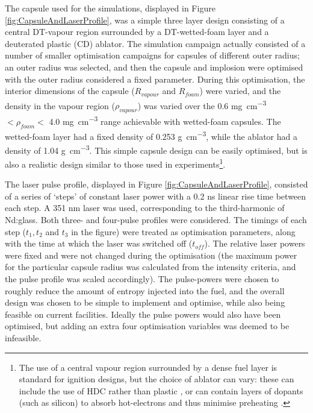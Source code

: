 The capsule used for the simulations, displayed in Figure \ref{fig:CapsuleAndLaserProfile}, was a simple three layer design consisting of a central DT-vapour region surrounded by a DT-wetted-foam layer and a deuterated plastic (CD) ablator. The simulation campaign actually consisted of a number of smaller optimisation campaigns for capsules of different outer radius; an outer radius was selected, and then the capsule and implosion were optimised with the outer radius considered a fixed parameter. During this optimisation, the interior dimensions of the capsule ($R_{vapour}$ and $R_{foam}$) were varied, and the density in the vapour region ($\rho_{vapour}$) was varied over the 0.6 \unit{\milli\gram\per\centi\meter\cubed} $< \rho_{foam} <$ 4.0 \unit{\milli\gram\per\centi\meter\cubed} range achievable with wetted-foam capsules. The wetted-foam layer had a fixed density of 0.253 \unit{\gram\per\centi\meter\cubed}, while the ablator had a density of 1.04 \unit{\gram\per\centi\meter\cubed}. This simple capsule design can be easily optimised, but is also a realistic design similar to those used in experiments\footnote{ The use of a central vapour region surrounded by a dense fuel layer is standard for ignition designs, but the choice of ablator can vary: these can include the use of HDC rather than plastic \cite{Mackinnon2014}, or can contain layers of dopants (such as silicon) to absorb hot-electrons and thus minimise preheating \cite{Solodov2022}.}. 

The laser pulse profile, displayed in Figure \ref{fig:CapsuleAndLaserProfile}, consisted of a series of `steps' of constant laser power with a 0.2 \unit{\nano\second} linear rise time between each step. A 351 \unit{\nano\meter} laser was used, corresponding to the third-harmonic of Nd:glass. Both three- and four-pulse profiles were considered. The timings of each step ($t_1, t_2$ and $t_3$ in the figure) were treated as optimisation parameters, along with the time at which the laser was switched off ($t_{off}$). The relative laser powers were fixed and were not changed during the optimisation (the maximum power for the particular capsule radius was calculated from the intensity criteria, and the pulse profile was scaled accordingly). The pulse-powers were chosen to roughly reduce the amount of entropy injected into the fuel, and the overall design was chosen to be simple to implement and optimise, while also being feasible on current facilities. Ideally the pulse powers would also have been optimised, but adding an extra four optimisation variables was deemed to be infeasible.

